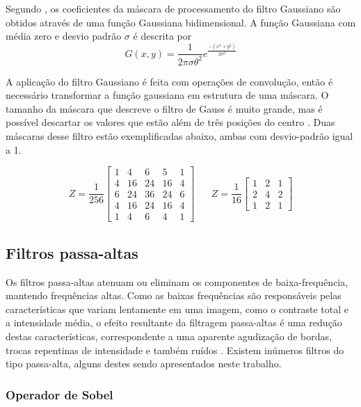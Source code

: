 \documentclass[12pt,oneside,a4paper,english,french,spanish,brazil,]{abntex2}
\begin{document}
Segundo \citet{pedrini:2008}, os coeficientes da máscara de processamento do filtro Gaussiano são obtidos através de uma função Gaussiana bidimensional. A função Gaussiana com média zero e desvio padrão \(\sigma\) é descrita por \[G(x,y)=\frac{1}{2\pi\sigma\theta^2} e^{\frac{-(x^2+y^2)}{2\sigma^2}  }\]

A aplicação do filtro Gaussiano é feita com operações de convolução, então é necessário transformar a função gaussiana em estrutura de uma máscara. O tamanho da máscara que descreve o filtro de Gauss é muito grande, mas é possível descartar os valores que estão além de três posições do centro \cite{conci:2003}. Duas máscaras desse filtro estão exemplificadas abaixo, ambas com desvio-padrão igual a 1.

\[Z=\frac{1}{256}\begin{bmatrix}
1 & 4 & 6 & 5 & 1\\ 
4 & 16 & 24 & 16 & 4\\ 
6 & 24 & 36 & 24 & 6\\ 
4 & 16 & 24 & 16 & 4\\ 
1 & 4 & 6 & 4 & 1
\end{bmatrix}
\; \; \; \; \; \; 
Z=\frac{1}{16}\begin{bmatrix}
1 & 2 & 1\\ 
2 & 4 & 2\\ 
1 & 2 & 1
\end{bmatrix}
\]

\subsection{Filtros passa-altas}

Os filtros passa-altas atenuam ou eliminam os componentes de baixa-frequência, mantendo frequências altas. Como as baixas frequências são responsáveis pelas características que variam lentamente em uma imagem, como o contraste total e a intensidade média, o efeito resultante da filtragem passa-altas é uma redução destas características, correspondente a uma aparente agudização de bordas, trocas repentinas de intensidade e também ruídos \cite{gonzalez:2012}. Existem inúmeros filtros do tipo passa-alta, alguns destes sendo apresentados neste trabalho.

\subsubsection{Operador de Sobel}

\end{document}
